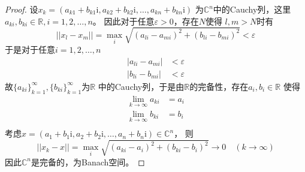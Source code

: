 \documentclass[cn]{homework}
\begin{document}
    \problem
    \newcommand{\img}{\mathrm i}
    \begin{proof}
        设$x_k=(a_{k1}+b_{k1}\img,a_{k2}+b_{k2}\img,\ldots,a_{kn}+b_{kn}\img)$
        为$\mathbb C^n$中的Cauchy列，这里$a_{ki},b_{ki}\in\mathbb R,i=1,2,\ldots,n$。
        因此对于任意$\varepsilon>0$，存在$N$使得
        $l,m>N$时有
        \[||x_l-x_m||=\max_i\sqrt{(a_{li}-a_{mi})^2+(b_{li}-b_{mi})^2}
        <\varepsilon\]
        于是对于任意$i=1,2,\ldots,n$
        \[\begin{aligned}
            |a_{li}-a_{mi}|&<\varepsilon\\
            |b_{li}-b_{mi}|&<\varepsilon
        \end{aligned}\]
        故$\{a_{ki}\}^\infty_{k=1},\{b_{ki}\}^\infty_{k=1}$为$\mathbb R$
        中的Cauchy列，于是由$\mathbb R$的完备性，存在$a_i,b_i\in\mathbb R$
        使得
        \[\begin{aligned}
            \lim_{k\to\infty}a_{ki}&=a_i\\
            \lim_{k\to\infty}b_{ki}&=b_i\\
        \end{aligned}\]
        考虑$x=(a_1+b_1\img,a_2+b_2\img,\ldots,a_n+b_n\img)\in\mathbb C^n$，
        则
        \[||x_k-x||=\max_i\sqrt{(a_{ki}-a_i)^2+(b_{ki}-b_i)^2}
        \to 0\quad(k\to\infty)\]
        因此$\mathbb C^n$是完备的，为Banach空间。
    \end{proof}
\end{document}
